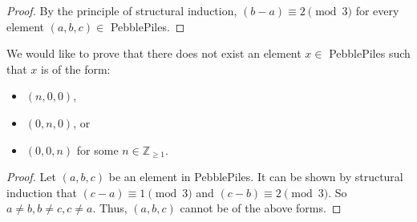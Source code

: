 \documentclass[12pt]{article}
\begin{document}
\begin{enumerate}
\begin{tasks}
\begin{proof}
                By the principle of structural induction, $(b-a)\equiv 2\pmod{3}$ for every element $(a,b,c)\in$ PebblePiles.
            \end{proof}
        \task We would like to prove that there does not exist an element $x\in$ PebblePiles such that $x$ is of the form:
            \begin{itemize}
                \item $(n,0,0)$,
                \item $(0,n,0)$, or 
                \item $(0,0,n)$ for some $n\in\mathbb{Z}_{\geq 1}$.
            \end{itemize}
            \begin{proof}
                Let $(a,b,c)$ be an element in PebblePiles. It can be shown by structural induction that $(c-a)\equiv 1\pmod{3}$ and $(c-b)\equiv 2\pmod{3}$. So $a\neq b, b\neq c, c\neq a$. Thus, $(a,b,c)$ cannot be of the above forms.
            \end{proof}
    \end{tasks}


\end{enumerate}
\end{document}

